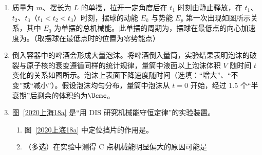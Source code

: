 \documentclass[\gkver]{gaokaozhenti}
\begin{document}
\begin{enumerate}
\item
质量为 $m$、摆长为 $L$ 的单摆，拉开一定角度后在 $t_{1}$ 时刻由静止释放，在 $t_{1}$、$t_{2}$、$t_{3}$（$t_{1} < t_{2} < t_{3}$）时刻，摆球的动能 $E_{k}$ 与势能 $E_{p}$ 第一次出现如图所示关系，其中 $E_{0}$ 为单摆的总机械能。此单摆的周期为，摆球在最低点的向心加速度为。（取摆球在最低点时的位置为零势能点）
\threepicture[showlabel=false, h=2.6cm, align=right]
{}
{}
{}

\item
倒入容器中的啤酒会形成大量泡沫。将啤酒倒入量筒，实验结果表明泡沫的破裂与原子核的衰变遵循同样的统计规律，量筒中液面以上泡沫体积 $V$ 随时间 $t$ 变化的关系如图所示。泡沫上表面下降速度随时间（选填：“增大”、“不变”或“减小”）。假设泡沫均匀分布，量筒中泡沫从 $t = 0$ 开始，经过 1.5 个“半衰期”后剩余的体积约为$\Ucmc$。
\onepicture[w=6.0cm, align=right]{}

\item
图~\ref{2020上海18a} 是“用 DIS 研究机械能守恒定律”的实验装置。
\begin{enumerate}
	\item
	图~\ref{2020上海18a} 中定位挡片的作用是。
	\item
	（多选）在实验中测得 C 点机械能明显偏大的原因可能是


\end{enumerate}
\end{enumerate}
\end{document}
